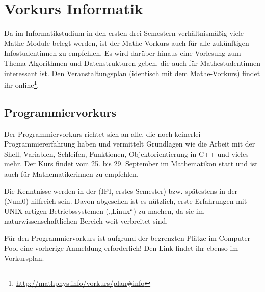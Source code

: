 \section{Vorkurs Informatik}
Da im Informatikstudium in den ersten drei Semestern verhältnismäßig viele Mathe-Module belegt werden, ist der Mathe-Vorkurs auch für alle zukünftigen Infostudentinnen zu empfehlen. Es wird darüber hinaus eine Vorlesung zum Thema Algorithmen und Datenstrukturen geben, die auch für Mathestudentinnen interessant ist. Den Veranstaltungsplan (identisch mit dem Mathe-Vorkurs) findet ihr online\footnote{\label{info-vorkursplan}\url{http://mathphys.info/vorkurs/plan\#info}}.

\subsection{Programmiervorkurs}
Der Programmiervorkurs richtet sich an alle, die noch keinerlei Programmiererfahrung haben und vermittelt Grundlagen wie die Arbeit mit der Shell, Variablen, Schleifen, Funktionen, Objektorientierung in C++ und vieles mehr. Der Kurs findet vom 25. bis 29. September im \gls{Mathematikon} statt und ist auch für Mathematikerinnen zu empfehlen.

Die Kenntnisse werden in der  (\gls{IPI}, erstes Semester) bzw. spätestens in der  (\gls{Num0}) hilfreich sein. Davon abgesehen ist es nützlich, erste Erfahrungen mit UNIX-artigen Betriebssystemen („Linux“) zu machen, da sie im naturwissenschaftlichen Bereich weit verbreitet sind.

Für den Programmiervorkurs ist aufgrund der begrenzten Plätze im Computer-Pool eine vorherige Anmeldung erforderlich! Den Link findet ihr ebenso im Vorkursplan.
